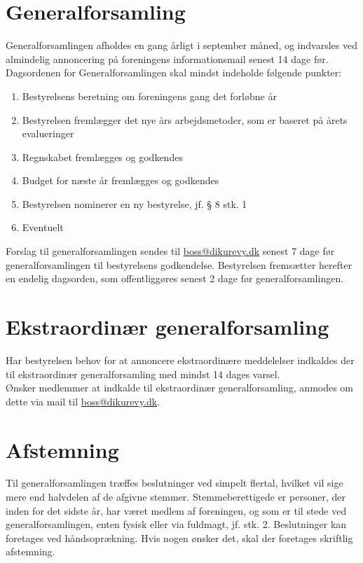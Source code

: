 \documentclass[a4paper,11pt,danish]{article}
\begin{document}
\section{Generalforsamling}
Generalforsamlingen afholdes en gang årligt i september måned, og indvarsles
ved almindelig annoncering på foreningens informationsmail senest 14 dage før. \\

\noindent Dagsordenen for Generalforsamlingen skal mindst indeholde følgende
punkter: 

\begin{enumerate}
\item Bestyrelsens beretning om foreningens gang det forløbne år
\item Bestyrelsen fremlægger det nye års arbejdsmetoder, som er baseret på årets
evalueringer
\item Regnskabet fremlægges og godkendes
\item Budget for næste år fremlægges og godkendes
\item Bestyrelsen nominerer en ny bestyrelse, jf. § 8 stk. 1
\item Eventuelt
\end{enumerate}

\noindent Forslag til generalforsamlingen sendes til \url{boss@dikurevy.dk}
senest 7 dage før generalforsamlingen til bestyrelsens godkendelse. Bestyrelsen
fremsætter herefter en endelig dagsorden, som offentliggøres senest 2 dage før
generalforsamlingen. 

\section{Ekstraordinær generalforsamling}
Har bestyrelsen behov for at annoncere ekstraordinære meddelelser indkaldes der
til ekstraordinær generalforsamling med mindst 14 dages varsel. \\

\noindent Ønsker medlemmer at indkalde til ekstraordinær generalforsamling,
anmodes om dette via mail til \url{boss@dikurevy.dk}.

\section{Afstemning}
Til generalforsamlingen træffes beslutninger ved simpelt flertal, hvilket
vil sige mere end halvdelen af de afgivne stemmer. Stemmeberettigede er
personer, der inden for det sidste år, har været medlem af foreningen, og som er
til stede ved generalforsamlingen, enten fysisk eller via fuldmagt, jf. stk. 2.
Beslutninger kan foretages ved håndsoprækning. Hvis nogen ønsker det, skal der
foretages skriftlig afstemning.
\end{document}
